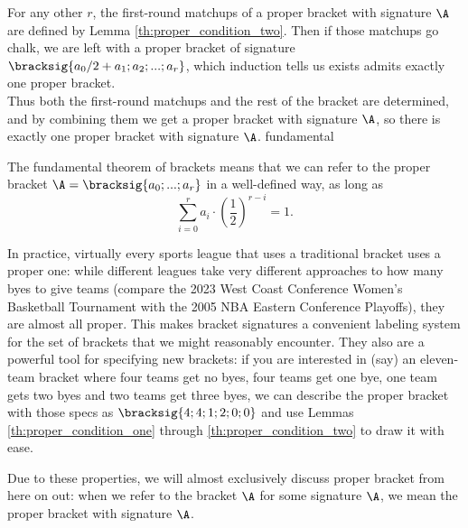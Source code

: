 {{        For any other $r$, the first-round matchups of a proper bracket with signature $\A$ are defined by Lemma \ref{th:proper_condition_two}. Then if those matchups go chalk, we are left with a proper bracket of signature $\bracksig{a_0/2 + a_1; a_2; ...; a_r}$, which induction tells us exists admits exactly one proper bracket.\\

        Thus both the first-round matchups and the rest of the bracket are determined, and by combining them we get a proper bracket with signature $\A$, so there is exactly one proper bracket with signature $\A$.
    }{fundamental}{\fried}

    \pagebreak

    The fundamental theorem of brackets means that we can refer to the proper bracket $\A = \bracksig{a_0; ...; a_r}$ in a well-defined way, as long as $$\sum_{i=0}^r a_i \cdot \left(\frac{1}{2}\right)^{r - i} = 1.$$

    In practice, virtually every sports league that uses a traditional bracket uses a proper one: while different leagues take very different approaches to how many byes to give teams (compare the 2023 West Coast Conference Women's Basketball Tournament with the 2005 NBA Eastern Conference Playoffs), they are almost all proper. This makes bracket signatures a convenient labeling system for the set of brackets that we might reasonably encounter. They also are a powerful tool for specifying new brackets: if you are interested in (say) an eleven-team bracket where four teams get no byes, four teams get one bye, one team gets two byes and two teams get three byes, we can describe the proper bracket with those specs as $\bracksig{4; 4; 1; 2; 0; 0}$ and use Lemmas \ref{th:proper_condition_one} through \ref{th:proper_condition_two} to draw it with ease.


    Due to these properties, we will almost exclusively discuss proper bracket from here on out: when we refer to the bracket $\A$ for some signature $\A$, we mean the proper bracket with signature $\A$.
}
